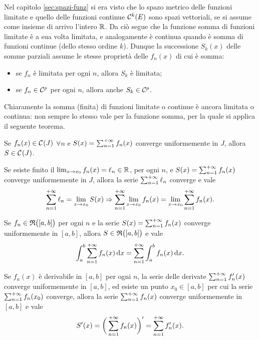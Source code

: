 Nel capitolo \ref{sec:spazi-funz} si era visto che lo spazo metrico delle funzioni limitate e quello delle funzioni continue $\mathcal{C}^{{k}}(E)$ sono spazi vettoriali, se si assume come insieme di arrivo l'intero $\mathbb{R}$. Da ciò segue che la funzione somma di funzioni limitate è a sua volta limitata, e analogamente è continua quando è somma di funzioni continue (dello stesso ordine $k$). Dunque la successione $S_k(x)$ delle somme parziali assume le stesse proprietà delle $f_n(x)$ di cui è somma:
\begin{itemize}
\item se $f_n$ è limitata per ogni $n$, allora $S_k$ è limitata;
\item se $f_n\in\mathcal{C}^{{p}}$ per ogni $n$, allora anche $S_k\in\mathcal{C}^{{p}}$.
\end{itemize}
Chiaramente la somma (finita) di funzioni limitate o continue è ancora limitata o continua: non sempre lo stesso vale per la funzione somma, per la quale si applica il seguente teorema.
\begin{teorema}
	Se $f_n(x)\in\mathcal{C}^{{}}(J)$ $\forall n$ e $S(x)=\sum_{{n}=1}^{+\infty}f_n(x)$ converge uniformemente in $J$, allora $S\in\mathcal{C}^{{}}(J)$.
\end{teorema}
\begin{teorema} \label{t:continuita_serie_conv_uniforme}
Se esiste finito il $\lim_{x\to x_0}f_n(x)=\ell_n\in\mathbb{R}$, per ogni $n$, e $S(x)=\sum_{{n}=1}^{+\infty}f_n(x)$ converge uniformemente in $J$, allora la serie $\sum_{{n}=1}^{+\infty}\ell_n$ converge e vale
\[
\sum_{{n}=1}^{+\infty}\ell_n=\lim_{x\to x_0}S(x)\Rightarrow\sum_{{n}=1}^{+\infty}\lim_{x\to x_0}f_n(x)=\lim_{x\to x_0}\sum_{{n}=1}^{+\infty}f_n(x).
\]
\end{teorema}
\begin{teorema} \label{t:scambio_integrale_serie}
Se $f_n\in\mathfrak{R}\big([a,b]\big)$ per ogni $n$ e la serie $S(x)=\sum_{{n}=1}^{+\infty}f_n(x)$ converge uniformemente in $[a,b]$, allora $S\in\mathfrak{R}\big([a,b]\big)$ e vale
\[
\int_a^b\sum_{{n}=1}^{+\infty}f_n(x)\,\textup{d} x=\sum_{{n}=1}^{+\infty}\int_a^bf_n(x)\,\textup{d} x.
\]
\end{teorema}
\begin{teorema} \label{t:scambio_derivata_serie}
Se $f_n(x)$ è derivabile in $[a,b]$ per ogni $n$, la serie delle derivate $\sum_{{n}=1}^{+\infty}f_n'(x)$ converge uniformemente in $[a,b]$, ed esiste un punto $x_0\in[a,b]$ per cui la serie $\sum_{{n}=1}^{+\infty}f_n(x_0)$ converge, allora la serie $\sum_{{n}=1}^{+\infty}f_n(x)$ converge uniformemente in $[a,b]$ e vale
\[
S'(x)=\bigg(\sum_{{n}=1}^{+\infty}f_n(x)\bigg)'=\sum_{{n}=1}^{+\infty}f_n'(x).
\]
\end{teorema}

